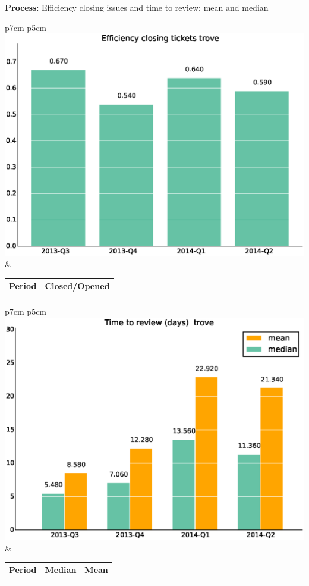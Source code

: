 \documentclass[a4wide,11pt]{report}
\begin{document}
\textbf{Process}: Efficiency closing issues and time to review: mean and median

\begin{tabular}{p{7cm} p{5cm}}
    \vspace{0pt} 
    \includegraphics[scale=.35]{figs/bmitrove.eps}
    & 
    \vspace{0pt}
    \begin{tabular}{l|l}%
    \bfseries Period & \bfseries Closed/Opened %
    \csvreader[head to column names]{data/bmitrove.csv}{}%
    {\\ & \bmi}
    \end{tabular}
\end{tabular}

\begin{tabular}{p{7cm} p{5cm}}
    \vspace{0pt} 
    \includegraphics[scale=.35]{figs/timetoreview_mediantrove.eps}
    & 
    \vspace{0pt}
    \begin{tabular}{l|r|r|}%
    \bfseries Period & \bfseries Median & \bfseries Mean %
    \csvreader[head to column names]{data/timetoreview_mediantrove.csv}{}%
    {\\ & \mediantime & \meantime}
    \end{tabular}
\end{tabular}
\end{document}
